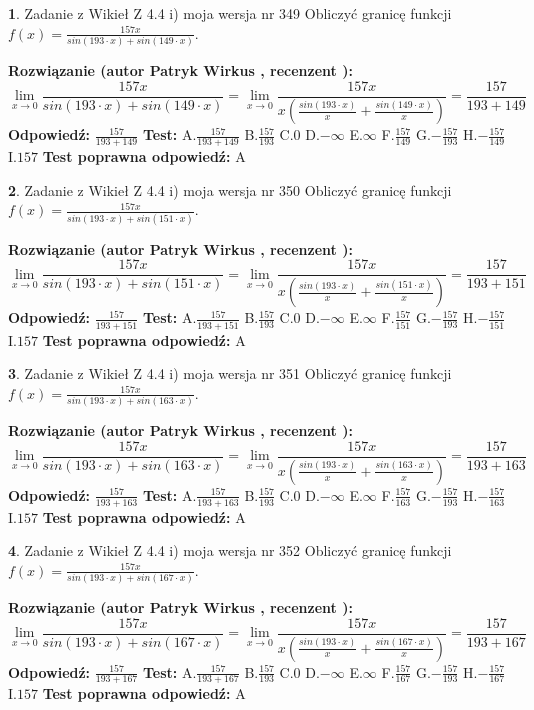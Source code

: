 \documentclass[12pt, a4paper]{article}
\theoremstyle{definition} %
\newtheorem{zad}{}
\newcommand{\zadStart}[1]{\begin{zad}#1\newline}
\newcommand{\zadStop}{\end{zad}}
\newcommand{\rozwStart}[2]{\noindent \textbf{Rozwiązanie (autor #1 , recenzent #2): }\newline}
\newcommand{\rozwStop}{\newline}
\newcommand{\odpStart}{\noindent \textbf{Odpowiedź:}\newline}
\newcommand{\odpStop}{\newline}
\newcommand{\testStart}{\noindent \textbf{Test:}\newline}
\newcommand{\testStop}{\newline}
\newcommand{\kluczStart}{\noindent \textbf{Test poprawna odpowiedź:}\newline}
\newcommand{\kluczStop}{\newline}
\begin{document}
\zadStart{Zadanie z Wikieł Z 4.4 i) moja wersja nr 349}
Obliczyć granicę funkcji $f(x)=\frac{157x}{sin(193\cdot x) +sin(149\cdot x)}$.
\zadStop
\rozwStart{Patryk Wirkus}{}
$$\lim\limits_{x\to 0}\frac{157x}{sin(193\cdot x) +sin(149\cdot x)}=\lim\limits_{x\to 0}\frac{157x}{x(\frac{sin(193\cdot x)}{x}+\frac{sin(149\cdot x)}{x})}=\frac{157}{193+149}$$
\rozwStop
\odpStart
$\frac{157}{193+149}$
\odpStop
\testStart
A.$\frac{157}{193+149}$
B.$\frac{157}{193}$
C.$0$
D.$-\infty$
E.$\infty$
F.$\frac{157}{149}$
G.$-\frac{157}{193}$
H.$-\frac{157}{149}$
I.$157$
\testStop
\kluczStart
A
\kluczStop



\zadStart{Zadanie z Wikieł Z 4.4 i) moja wersja nr 350}
Obliczyć granicę funkcji $f(x)=\frac{157x}{sin(193\cdot x) +sin(151\cdot x)}$.
\zadStop
\rozwStart{Patryk Wirkus}{}
$$\lim\limits_{x\to 0}\frac{157x}{sin(193\cdot x) +sin(151\cdot x)}=\lim\limits_{x\to 0}\frac{157x}{x(\frac{sin(193\cdot x)}{x}+\frac{sin(151\cdot x)}{x})}=\frac{157}{193+151}$$
\rozwStop
\odpStart
$\frac{157}{193+151}$
\odpStop
\testStart
A.$\frac{157}{193+151}$
B.$\frac{157}{193}$
C.$0$
D.$-\infty$
E.$\infty$
F.$\frac{157}{151}$
G.$-\frac{157}{193}$
H.$-\frac{157}{151}$
I.$157$
\testStop
\kluczStart
A
\kluczStop



\zadStart{Zadanie z Wikieł Z 4.4 i) moja wersja nr 351}
Obliczyć granicę funkcji $f(x)=\frac{157x}{sin(193\cdot x) +sin(163\cdot x)}$.
\zadStop
\rozwStart{Patryk Wirkus}{}
$$\lim\limits_{x\to 0}\frac{157x}{sin(193\cdot x) +sin(163\cdot x)}=\lim\limits_{x\to 0}\frac{157x}{x(\frac{sin(193\cdot x)}{x}+\frac{sin(163\cdot x)}{x})}=\frac{157}{193+163}$$
\rozwStop
\odpStart
$\frac{157}{193+163}$
\odpStop
\testStart
A.$\frac{157}{193+163}$
B.$\frac{157}{193}$
C.$0$
D.$-\infty$
E.$\infty$
F.$\frac{157}{163}$
G.$-\frac{157}{193}$
H.$-\frac{157}{163}$
I.$157$
\testStop
\kluczStart
A
\kluczStop



\zadStart{Zadanie z Wikieł Z 4.4 i) moja wersja nr 352}
Obliczyć granicę funkcji $f(x)=\frac{157x}{sin(193\cdot x) +sin(167\cdot x)}$.
\zadStop
\rozwStart{Patryk Wirkus}{}
$$\lim\limits_{x\to 0}\frac{157x}{sin(193\cdot x) +sin(167\cdot x)}=\lim\limits_{x\to 0}\frac{157x}{x(\frac{sin(193\cdot x)}{x}+\frac{sin(167\cdot x)}{x})}=\frac{157}{193+167}$$
\rozwStop
\odpStart
$\frac{157}{193+167}$
\odpStop
\testStart
A.$\frac{157}{193+167}$
B.$\frac{157}{193}$
C.$0$
D.$-\infty$
E.$\infty$
F.$\frac{157}{167}$
G.$-\frac{157}{193}$
H.$-\frac{157}{167}$
I.$157$
\testStop
\kluczStart
A
\kluczStop
\end{document}
